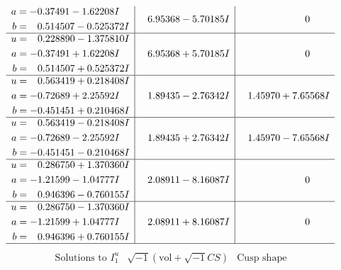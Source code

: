 \documentclass[1p]{elsarticle_modified}
\theoremstyle{definition}
\newcommand{\I}{\sqrt{-1}}
\begin{document}
$$\begin{array}{c|c|c}
\begin{aligned}
a &= -0.37491 - 1.62208 I \\
b &= \phantom{-}0.514507 - 0.525372 I\end{aligned}
 & \phantom{-}6.95368 - 5.70185 I & \phantom{-0.000000 } 0 \\ \hline\begin{aligned}
u &= \phantom{-}0.228890 - 1.375810 I \\
a &= -0.37491 + 1.62208 I \\
b &= \phantom{-}0.514507 + 0.525372 I\end{aligned}
 & \phantom{-}6.95368 + 5.70185 I & \phantom{-0.000000 } 0 \\ \hline\begin{aligned}
u &= \phantom{-}0.563419 + 0.218408 I \\
a &= -0.72689 + 2.25592 I \\
b &= -0.451451 + 0.210468 I\end{aligned}
 & \phantom{-}1.89435 - 2.76342 I & \phantom{-}1.45970 + 7.65568 I \\ \hline\begin{aligned}
u &= \phantom{-}0.563419 - 0.218408 I \\
a &= -0.72689 - 2.25592 I \\
b &= -0.451451 - 0.210468 I\end{aligned}
 & \phantom{-}1.89435 + 2.76342 I & \phantom{-}1.45970 - 7.65568 I \\ \hline\begin{aligned}
u &= \phantom{-}0.286750 + 1.370360 I \\
a &= -1.21599 - 1.04777 I \\
b &= \phantom{-}0.946396 - 0.760155 I\end{aligned}
 & \phantom{-}2.08911 - 8.16087 I & \phantom{-0.000000 } 0 \\ \hline\begin{aligned}
u &= \phantom{-}0.286750 - 1.370360 I \\
a &= -1.21599 + 1.04777 I \\
b &= \phantom{-}0.946396 + 0.760155 I\end{aligned}
 & \phantom{-}2.08911 + 8.16087 I & \phantom{-0.000000 } 0\\
 \hline 
 \end{array}$$\newpage$$\begin{array}{c|c|c}  
\text{Solutions to }I^u_{1}& \I (\text{vol} + \sqrt{-1}CS) & \text{Cusp shape}\\
 \hline 
\begin{aligned}

\end{aligned}
\end{array}$$
\end{document}

